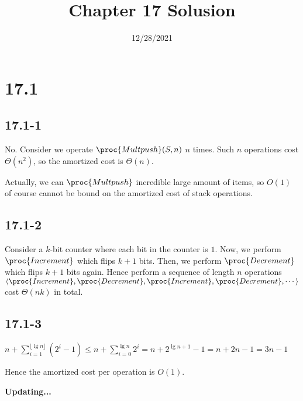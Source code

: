 

\title{Chapter 17 Solusion}
\date{12/28/2021}


\maketitle

\section*{17.1}

\subsection*{17.1-1}

No.
Consider we operate $\proc{Multpush}(S,n)$ $n$ times.
Such $n$ operations cost $\Theta(n^2)$, 
so the amortized cost is $\Theta(n)$.

Actually, we can $\proc{Multpush}$ incredible large amount of items,
so $O(1)$ of course cannot be bound on the amortized cost
of stack operations.

\subsection*{17.1-2}

Consider a $k$-bit counter where each bit in the counter is $1$.
Now, we perform $\proc{Increment}$ which flips $k+1$ bits.
Then, we perform $\proc{Decrement}$ which flips $k+1$ bits again.
Hence perform a sequence of length $n$ operations 
$\langle \proc{Increment}, \proc{Decrement}, 
\proc{Increment}, \proc{Decrement}, \cdots \rangle$
cost $\Theta(nk)$ in total.

\subsection*{17.1-3}

$n + \sum\limits_{i = 1}^{\lfloor \lg n \rfloor} (2^i - 1)
\leq n + \sum\limits_{i = 0}^{\lg n} 2^i
= n + 2^{\lg n + 1} - 1 = n + 2n - 1 = 3n - 1$

Hence the amortized cost per operation is $O(1)$.



\centerline{\textbf{Updating...}}

